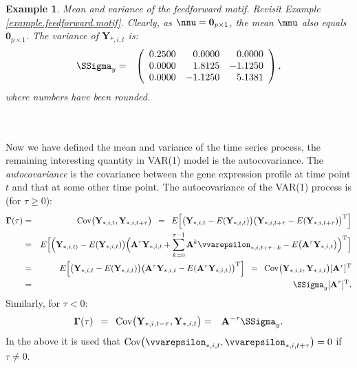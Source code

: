 \documentclass[a4paper]{article}
\theoremstyle{myexamplestyle}
\newtheorem{example}{Example}
\begin{document}
\begin{example} \textit{Mean and variance of the feedforward motif.}
Revisit Example \ref{example.feedforward.motif}. Clearly, as $\nnu = \mathbf{0}_{p \times 1}$, the mean $\mmu$ also equals $\mathbf{0}_{p \times 1}$. The variance of $\mathbf{Y}_{\ast, i, t}$ is:
\begin{eqnarray*}
\SSigma_{y} & = &
\left(
\begin{array}{rrr}
0.2500 & 0.0000 & 0.0000
\\
0.0000 & 1.8125 & -1.1250
\\
0.0000 & -1.1250 & 5.1381
\end{array}
\right),
\end{eqnarray*}
where numbers have been rounded.
\end{example}
\mbox{ }
\\
\\
Now we have defined the mean and variance of the time series process, the remaining interesting quantity in VAR(1) model is the autocovariance. The {\it autocovariance} is the covariance between the gene expression profile at time point $t$ and that at some other time point. The autocovariance of the VAR(1) process is (for $\tau \geq 0$):
\begin{eqnarray*}
\mathbf{\Gamma}(\tau) & = & \mbox{Cov} \big( \mathbf{Y}_{\ast,i,t}, \mathbf{Y}_{\ast,i,t+\tau} \big)
\, \, \, = \, \, \, E\Big[ \big(\mathbf{Y}_{\ast,i,t} - E(\mathbf{Y}_{\ast,i,t}) \big) \big(\mathbf{Y}_{\ast,i,t+\tau} - E(\mathbf{Y}_{\ast,i,t+\tau}) \big)^{\mathrm{T}} \Big]
\\
& = & E\Big[ \Big(\mathbf{Y}_{\ast,i,t)} - E(\mathbf{Y}_{\ast,i,t}) \big) \Big( \mathbf{A}^{\tau} \mathbf{Y}_{\ast,i,t} + \sum_{k=0}^{\tau-1} \mathbf{A}^k \vvarepsilon_{\ast,i,t+\tau-k} - E \big(\mathbf{A}^{\tau} \mathbf{Y}_{\ast,i,t} \big) \Big)^{\mathrm{T}} \Big]
\\
& = & E \Big[ \big(\mathbf{Y}_{\ast,i,t} - E(\mathbf{Y}_{\ast,i,t}) \big) \big( \mathbf{A}^{\tau} \mathbf{Y}_{\ast,i,t} - E(\mathbf{A}^{\tau} \mathbf{Y}_{\ast,i,t}) \big)^{\mathrm{T}} \Big]
\, \, \, = \, \, \, \mbox{Cov} \big( \mathbf{Y}_{\ast,i,t}, \mathbf{Y}_{\ast,i,t} \big) [\mathbf{A}^{\tau}]^{\mathrm{T}}
\\
& = & \SSigma_y [\mathbf{A}^{\tau}]^{\mathrm{T}}.
\end{eqnarray*}
Similarly, for $\tau < 0$:
\begin{eqnarray*}
\mathbf{\Gamma}(\tau) \, \, \, = \, \, \,  \mbox{Cov} \big( \mathbf{Y}_{\ast,i,t-\tau}, \mathbf{Y}_{\ast,i,t} \big) & = & \mathbf{A}^{-\tau} \SSigma_y.
\end{eqnarray*}
In the above it is used that $\mbox{Cov} \big( \vvarepsilon_{\ast,i,t}, \vvarepsilon_{\ast,i,t+\tau} \big) = 0$ if $\tau \not= 0$.
\end{document}
